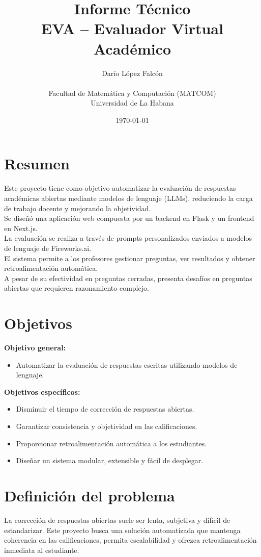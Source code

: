 \documentclass[12pt]{article}
\title{Informe Técnico\\ \large EVA – Evaluador Virtual Académico}
\author{Darío López Falcón\\\\Facultad de Matemática y Computación (MATCOM)\\Universidad de La Habana}
\date{\today}
\begin{document}
\maketitle

\section*{Resumen}
Este proyecto tiene como objetivo automatizar la evaluación de respuestas académicas abiertas mediante modelos de lenguaje (LLMs), reduciendo la carga de trabajo docente y mejorando la objetividad.\\
\noindent\hspace*{1em}Se diseñó una aplicación web compuesta por un backend en Flask y un frontend en Next.js.\\
\noindent\hspace*{1em}La evaluación se realiza a través de prompts personalizados enviados a modelos de lenguaje de Fireworks.ai.\\
\noindent\hspace*{1em}El sistema permite a los profesores gestionar preguntas, ver resultados y obtener retroalimentación automática.\\
\noindent\hspace*{1em}A pesar de su efectividad en preguntas cerradas, presenta desafíos en preguntas abiertas que requieren razonamiento complejo.

\section*{Objetivos}
\textbf{Objetivo general:}
\begin{itemize}
  \item Automatizar la evaluación de respuestas escritas utilizando modelos de lenguaje.
\end{itemize}

\textbf{Objetivos específicos:}
\begin{itemize}
  \item Disminuir el tiempo de corrección de respuestas abiertas.
  \item Garantizar consistencia y objetividad en las calificaciones.
  \item Proporcionar retroalimentación automática a los estudiantes.
  \item Diseñar un sistema modular, extensible y fácil de desplegar.
\end{itemize}

\section{Definición del problema}
La corrección de respuestas abiertas suele ser lenta, subjetiva y difícil de estandarizar. Este proyecto busca una solución automatizada que mantenga coherencia en las calificaciones, permita escalabilidad y ofrezca retroalimentación inmediata al estudiante.
\end{document}
